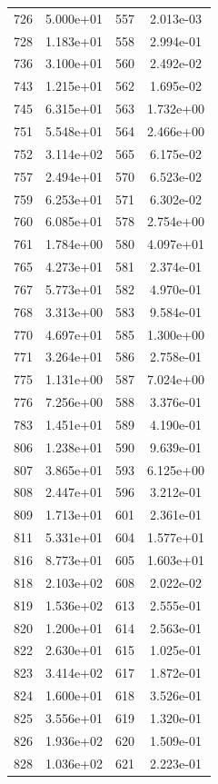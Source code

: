 \documentclass[12pt]{article}
\begin{document}
\begin{longtable}{@{}cccc@{}}
726 & 5.000e+01 & 557 & 2.013e-03 \\
728 & 1.183e+01 & 558 & 2.994e-01 \\
736 & 3.100e+01 & 560 & 2.492e-02 \\
743 & 1.215e+01 & 562 & 1.695e-02 \\
745 & 6.315e+01 & 563 & 1.732e+00 \\
751 & 5.548e+01 & 564 & 2.466e+00 \\
752 & 3.114e+02 & 565 & 6.175e-02 \\
757 & 2.494e+01 & 570 & 6.523e-02 \\
759 & 6.253e+01 & 571 & 6.302e-02 \\
760 & 6.085e+01 & 578 & 2.754e+00 \\
761 & 1.784e+00 & 580 & 4.097e+01 \\
765 & 4.273e+01 & 581 & 2.374e-01 \\
767 & 5.773e+01 & 582 & 4.970e-01 \\
768 & 3.313e+00 & 583 & 9.584e-01 \\
770 & 4.697e+01 & 585 & 1.300e+00 \\
771 & 3.264e+01 & 586 & 2.758e-01 \\
775 & 1.131e+00 & 587 & 7.024e+00 \\
776 & 7.256e+00 & 588 & 3.376e-01 \\
783 & 1.451e+01 & 589 & 4.190e-01 \\
806 & 1.238e+01 & 590 & 9.639e-01 \\
807 & 3.865e+01 & 593 & 6.125e+00 \\
808 & 2.447e+01 & 596 & 3.212e-01 \\
809 & 1.713e+01 & 601 & 2.361e-01 \\
811 & 5.331e+01 & 604 & 1.577e+01 \\
816 & 8.773e+01 & 605 & 1.603e+01 \\
818 & 2.103e+02 & 608 & 2.022e-02 \\
819 & 1.536e+02 & 613 & 2.555e-01 \\
820 & 1.200e+01 & 614 & 2.563e-01 \\
822 & 2.630e+01 & 615 & 1.025e-01 \\
823 & 3.414e+02 & 617 & 1.872e-01 \\
824 & 1.600e+01 & 618 & 3.526e-01 \\
825 & 3.556e+01 & 619 & 1.320e-01 \\
826 & 1.936e+02 & 620 & 1.509e-01 \\
828 & 1.036e+02 & 621 & 2.223e-01 \\

\end{longtable}
\end{document}

